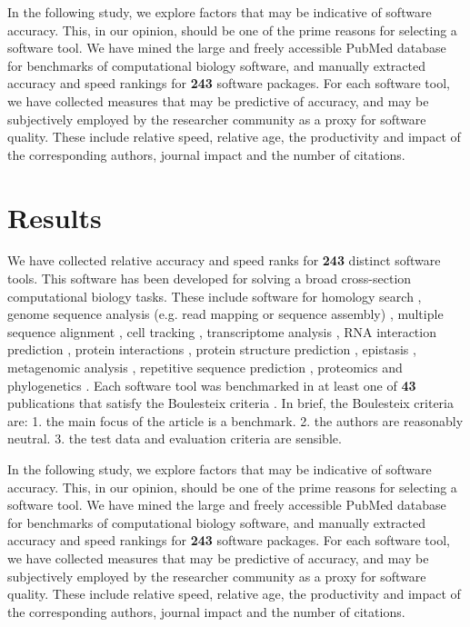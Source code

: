 \documentclass[fleqn,10pt]{SelfArx} %
\begin{document}
In the following study, we explore factors that may be indicative of software accuracy. This, in our opinion, should be one of the prime reasons for selecting a software tool. We have mined the large and freely accessible PubMed database \cite{Sayers2010-vm} for benchmarks of computational biology software, and manually extracted accuracy and speed rankings for \textbf{{\color{black}243}} software packages. For each software tool, we have collected measures that may be predictive of accuracy, and may be subjectively employed by the researcher community as a proxy for software quality. These include relative speed, relative age, the productivity and impact of the corresponding authors, journal impact and the number of citations. 

\section*{Results}
We have collected relative accuracy and speed ranks for \textbf{{\color{black}243}} distinct software tools. This software has been developed for solving a broad cross-section computational biology tasks. These include software for homology search \cite{Freyhult2007-et}, genome sequence analysis (e.g. read mapping or sequence assembly) \cite{Junemann2014-mb,Tran2014-pe,Zhang2011-nd,Abbas2014-gu,Bao2011-lv,Caboche2014-lj,Kleftogiannis2013-wi,Hatem2013-cs,Schbath2012-ob,Ruffalo2011-rl,Yang2013-aj,Holtgrewe2011-fd,Rackham2015-ag,Huang2015-wu}, multiple sequence alignment \cite{Thompson2011-rf,Nuin2006-nk,Pais2014-sr,Pervez2014-zp,Liu2010-rp}, cell tracking \cite{Maska2014-ak}, transcriptome analysis \cite{Li2012-wr,Lu2013-fs,Liu2014-kz,Kumar2016-xz}, RNA interaction prediction \cite{Pain2015-gr}, protein interactions \cite{Tikk2010-qd}, protein structure prediction \cite{Kolodny2005-ry,Wallner2005-qi}, epistasis \cite{Shang2011-vy},  metagenomic analysis \cite{Lindgreen2016-tt,Bazinet2012-wf}, repetitive sequence prediction \cite{Saha2008-kd}, proteomics \cite{Lange2008-pt,Yang2009-oc} and phylogenetics \cite{Liu2011-pz,Yang2011-dv,Oscamou2008-md,Bayzid2013-hc,Liu2009-lx}. Each software tool was benchmarked in at least one of \textbf{{\color{black}43}} publications that satisfy the Boulesteix criteria \cite{Boulesteix2013-vb}. In brief, the Boulesteix criteria are: 1. the main focus of the article is a benchmark. 2. the authors are reasonably neutral. 3. the test data and evaluation criteria are sensible.

In the following study, we explore factors that may be indicative of software accuracy. This, in our opinion, should be one of the prime reasons for selecting a software tool. We have mined the large and freely accessible PubMed database \cite{Sayers2010-vm} for benchmarks of computational biology software, and manually extracted accuracy and speed rankings for \textbf{{\color{red}243}} software packages. For each software tool, we have collected measures that may be predictive of accuracy, and may be subjectively employed by the researcher community as a proxy for software quality. These include relative speed, relative age, the productivity and impact of the corresponding authors, journal impact and the number of citations. 
\end{document}
